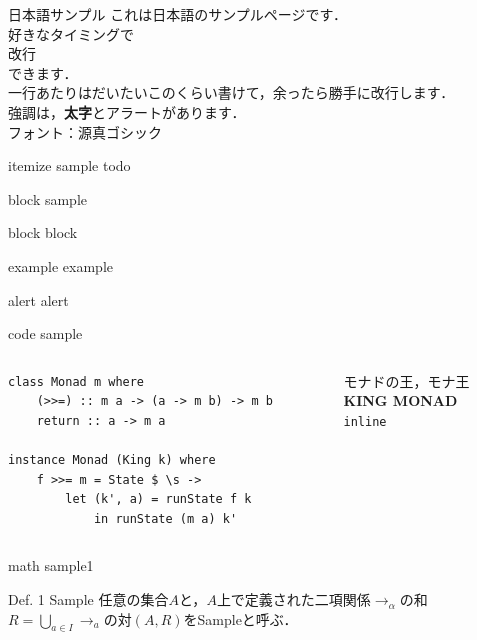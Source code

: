 \documentclass[aspectratio=1610,14pt]{beamer}
\begin{document}
\begin{frame}{日本語サンプル}
    これは日本語のサンプルページです．\\
    好きなタイミングで\\
    \alert{改行}\\
    できます．\\
    一行あたりはだいたいこのくらい書けて，余ったら勝手に改行します．\\
    強調は，\textbf{太字}と\alert{アラート}があります．\\
    フォント：源真ゴシック
\end{frame}

\begin{frame}{itemize sample}
    todo
\end{frame}

\begin{frame}{block sample}
    \begin{block}{block}
        block
    \end{block}
    \begin{exampleblock}{example}
        example
    \end{exampleblock}
    \begin{alertblock}{alert}
        alert
    \end{alertblock}
\end{frame}

\begin{frame}[fragile]{code sample}
    \begin{columns}
        \begin{column}{0.5\textwidth}
            \begin{lstlisting}
class Monad m where 
    (>>=) :: m a -> (a -> m b) -> m b 
    return :: a -> m a

instance Monad (King k) where
    f >>= m = State $ \s ->
        let (k', a) = runState f k
            in runState (m a) k'
            \end{lstlisting}
        \end{column}
        \begin{column}{0.5\textwidth}
            モナドの王，モナ王 \\
            \textbf{KING MONAD}\\
            \lstinline|inline|
        \end{column}
    \end{columns}
\end{frame}


\begin{frame}{math sample1}
    \begin{block}{Def. 1 Sample}
        任意の集合$A$と，$A$上で定義された二項関係$\to_{\alpha}$の和$R = \bigcup_{a \in I} \to_a $の対$(A, R)$をSampleと呼ぶ．
    \end{block}

\end{frame}
\end{document}
